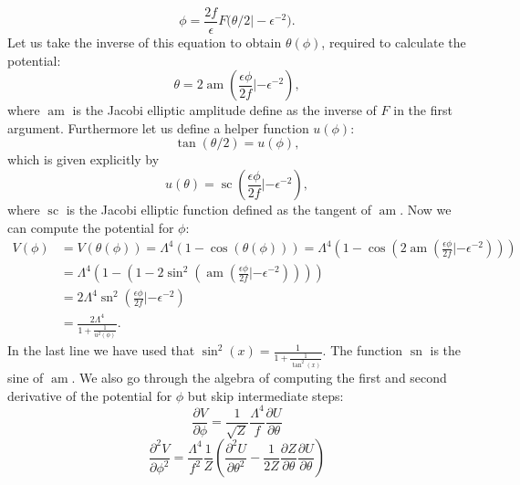 \documentclass[master,       %
               twoside,        %
               BCOR10mm,       %
               english,ngerman, %
               ]{GAUBM}
\begin{document}
\begin{otherlanguage}{english}
\begin{equation}
	\phi = \frac{2 f}{\epsilon} F\big(\theta / 2 \big| - \epsilon^{-2} \big).
\end{equation}
Let us take the inverse of this equation to obtain $\theta(\phi)$, required to calculate the potential:
\begin{equation}
	\theta = 2 \operatorname{am}\left(\frac{\epsilon \phi}{2 f} | - \epsilon^{-2}\right),
\end{equation}
where $\operatorname{am}$ is the Jacobi elliptic amplitude define as the inverse of $F$ in the first argument.
Furthermore let us define a helper function $u(\phi)$:
\begin{equation}
	\tan(\theta / 2) = u(\phi),
\end{equation}
which is given explicitly by
\begin{equation}
	u(\theta) = \operatorname{sc}(\frac{\epsilon \phi}{2 f} | - \epsilon^{-2}),
\end{equation}
where $\operatorname{sc}$ is the Jacobi elliptic function defined as the tangent of $\operatorname{am}$.
Now we can compute the potential for $\phi$:
\begin{align}
	V(\phi) &= V(\theta(\phi)) = \Lambda^4 (1 - \cos (\theta(\phi)))
	= \Lambda^4 ( 1 - \cos (2 \operatorname{am} ( \frac{\epsilon \phi}{2 f} | - \epsilon^{-2}) )) \nonumber \\
	&= \Lambda^4 ( 1 - (1 - 2 \sin^2( \operatorname{am}(\frac{\epsilon \phi}{2 f} | - \epsilon^{-2})))) \nonumber \\
	&= 2 \Lambda^4 \operatorname{sn}^2 ( \frac{\epsilon \phi}{2 f} | - \epsilon^{-2} ) \nonumber \\
	&= \frac{2 \Lambda^4}{1 + \frac{1}{u^2(\phi)}}.
\end{align}
In the last line we have used that $\sin^2(x) = \frac{1}{1 + \frac{1}{\tan^2(x)}}$. The function $\operatorname{sn}$ is the sine of $\operatorname{am}$.
We also go through the algebra of computing the first and second derivative of the potential for $\phi$ but skip intermediate steps:
\begin{equation}
	\frac{\partial V}{\partial \phi} = \frac{1}{\sqrt{Z}} \frac{\Lambda^4}{f} \frac{\partial U}{\partial \theta}
\end{equation}
\begin{equation}
	\frac{\partial^2 V}{\partial \phi^2} = \frac{\Lambda^4}{f^2} \frac{1}{Z} \left( \frac{\partial^2 U}{\partial \theta^2} - \frac{1}{2 Z} \frac{\partial Z}{\partial \theta} \frac{\partial U}{\partial \theta} \right)

\end{equation}
\end{otherlanguage}
\end{document}
